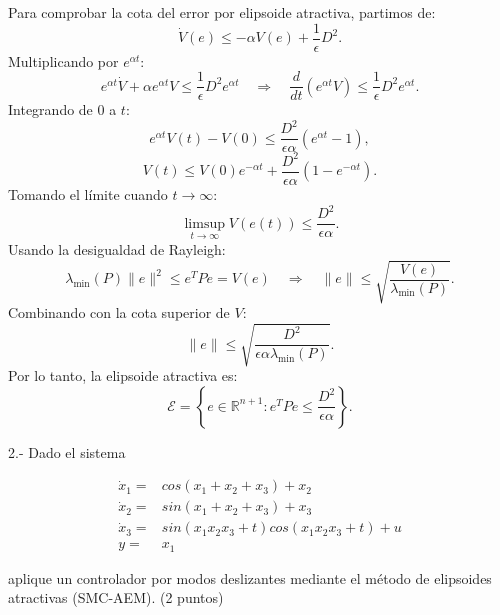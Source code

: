 \begin{itemize}
Para comprobar la cota del error por elipsoide atractiva, partimos de:
\begin{equation*}
    \dot{V}(e) \leq -\alpha V(e) + \frac{1}{\epsilon}D^2.
\end{equation*}
Multiplicando por \(e^{\alpha t}\):
\begin{equation*}
    e^{\alpha t}\dot{V} + \alpha e^{\alpha t}V \leq \frac{1}{\epsilon}D^2 e^{\alpha t} \quad \Rightarrow \quad \frac{d}{dt}(e^{\alpha t}V) \leq \frac{1}{\epsilon}D^2 e^{\alpha t}.
\end{equation*}
Integrando de \(0\) a \(t\):
\begin{equation*}
    e^{\alpha t}V(t) - V(0) \leq \frac{D^2}{\epsilon \alpha}(e^{\alpha t} - 1),
\end{equation*}
\begin{equation*}
    V(t) \leq V(0)e^{-\alpha t} + \frac{D^2}{\epsilon \alpha}(1 - e^{-\alpha t}).
\end{equation*}
Tomando el límite cuando \(t \to \infty\):
\begin{equation*}
    \limsup_{t \to \infty} V(e(t)) \leq \frac{D^2}{\epsilon \alpha}.
\end{equation*}
Usando la desigualdad de Rayleigh:
\begin{equation*}
    \lambda_{\min}(P)\|e\|^2 \leq e^T P e = V(e) \quad \Rightarrow \quad \|e\| \leq \sqrt{\frac{V(e)}{\lambda_{\min}(P)}}.
\end{equation*}
Combinando con la cota superior de \(V\):
\begin{equation*}
    \|e\| \leq \sqrt{\frac{D^2}{\epsilon \alpha \lambda_{\min}(P)}}.
\end{equation*}
Por lo tanto, la elipsoide atractiva es:
\begin{equation*}
    \mathcal{E} = \left\{ e \in \mathbb{R}^{n+1} : e^T P e \leq \frac{D^2}{\epsilon \alpha} \right\}.
\end{equation*}





\end{itemize}









2.-  Dado el sistema

\begin{equation*}
    \begin{aligned}
        \dot{x}_1 =& cos(x_1+x_2+x_3)+x_2 \\
        \dot{x}_2 =& sin (x_1+x_2+x_3)+x_3\\
        \dot{x}_3=& sin(x_1x_2x_3+t)cos(x_1x_2x_3+t)+u\\
    y=& x_1    \end{aligned}
\end{equation*}


aplique un controlador por modos deslizantes mediante el método de elipsoides atractivas (SMC-AEM). (2 puntos)

\newpage








